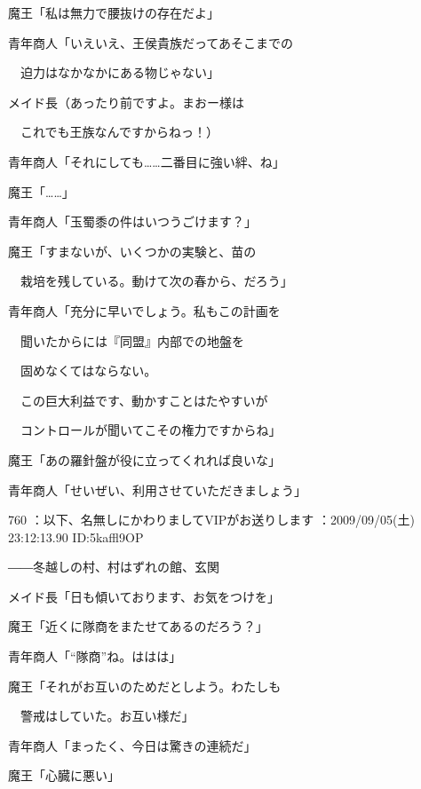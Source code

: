 \documentclass[a4j,twocolumn]{tarticle}
\begin{document}
魔王「私は無力で腰抜けの存在だよ」 



青年商人「いえいえ、王侯貴族だってあそこまでの\par{} 
　迫力はなかなかにある物じゃない」 



メイド長（あったり前ですよ。まおー様は\par{} 
　これでも王族なんですからねっ！） 



青年商人「それにしても……二番目に強い絆、ね」\par{} 
魔王「……」 



青年商人「玉蜀黍の件はいつうごけます？」\par{} 
魔王「すまないが、いくつかの実験と、苗の\par{} 
　栽培を残している。動けて次の春から、だろう」 



青年商人「充分に早いでしょう。私もこの計画を\par{} 
　聞いたからには『同盟』内部での地盤を\par{} 
　固めなくてはならない。\par{} 
　この巨大利益です、動かすことはたやすいが \par{}
　コントロールが聞いてこその権力ですからね」 



魔王「あの羅針盤が役に立ってくれれば良いな」\par{} 
青年商人「せいぜい、利用させていただきましょう」 

	
    
    

760 ：以下、名無しにかわりましてVIPがお送りします ：2009/09/05(土) 23:12:13.90 ID:5kaffl9OP 


――冬越しの村、村はずれの館、玄関 



メイド長「日も傾いております、お気をつけを」\par{} 
魔王「近くに隊商をまたせてあるのだろう？」 



青年商人「“隊商”ね。ははは」\par{} 
魔王「それがお互いのためだとしよう。わたしも\par{} 
　警戒はしていた。お互い様だ」 



青年商人「まったく、今日は驚きの連続だ」\par{} 
魔王「心臓に悪い」 
\end{document}
